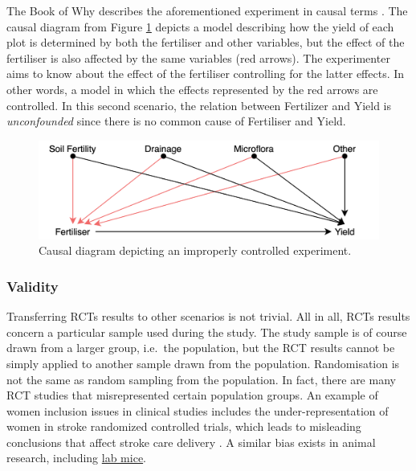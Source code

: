 \documentclass[
]{book}
\begin{document}
The Book of Why describes the aforementioned experiment in causal terms \citep{book-of-why}. The causal diagram from Figure \ref{fig:rct-diagram} depicts a model describing how the yield of each plot is determined by both the fertiliser and other variables, but the effect of the fertiliser is also affected by the same variables (red arrows). The experimenter aims to know about the effect of the fertiliser controlling for the latter effects. In other words, a model in which the effects represented by the red arrows are controlled. In this second scenario, the relation between Fertilizer and Yield is \emph{unconfounded} since there is no common cause of Fertiliser and Yield.

\begin{figure}

{\centering \includegraphics[width=1\linewidth]{Figures/RCT-causal-diagram} 

}

\caption{Causal diagram depicting an improperly controlled experiment.}\label{fig:rct-diagram}
\end{figure}

\hypertarget{validity}{%
\subsubsection{Validity}\label{validity}}

Transferring RCTs results to other scenarios is not trivial. All in all, RCTs results concern a particular sample used during the study. The study sample is of course drawn from a larger group, i.e.~the population, but the RCT results cannot be simply applied to another sample drawn from the population. Randomisation is not the same as random sampling from the population. In fact, there are many RCT studies that misrepresented certain population groups. An example of women inclusion issues in clinical studies includes the under-representation of women in stroke randomized controlled trials, which leads to misleading conclusions that affect stroke care delivery \citep{tsivgoulis2017under}. A similar bias exists in animal research, including \href{https://www.wired.com/2016/07/science-huge-diversity-problem-lab-rats/}{lab mice}.
\end{document}

